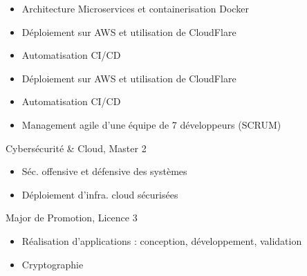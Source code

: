 \documentclass[10pt,a4paper,ragged2e,withhyper]{altacv}
\begin{document}
\begin{paracol}{2}

\begin{itemize}
    \item Architecture Microservices et containerisation Docker
    \item Déploiement sur AWS et utilisation de CloudFlare
    \item Automatisation CI/CD
\end{itemize}

\divider{}
\begin{itemize}
    \item Déploiement sur AWS et utilisation de CloudFlare
    \item Automatisation CI/CD
    \item Management agile d'une équipe de 7 développeurs (SCRUM)
\end{itemize}


\switchcolumn



\divider



{\faLock} Cybersécurité \& Cloud, Master 2\break
\begin{itemize}
    \item Séc. offensive et défensive des systèmes
    \item Déploiement d'infra. cloud sécurisées
\end{itemize}

\divider

{\faTrophy} Major de Promotion, Licence 3\break
\begin{itemize}
    \item Réalisation d'applications : conception, développement, validation
    \item Cryptographie
\end{itemize}


\end{paracol}
\end{document}
